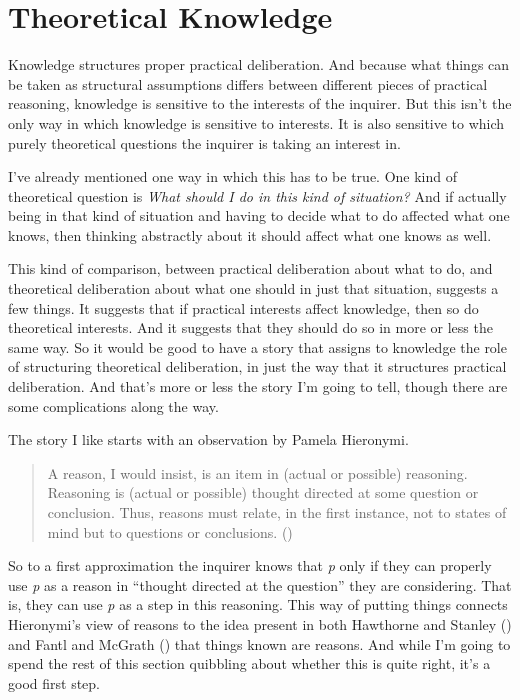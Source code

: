 \documentclass[
  12pt,
  letterpaper,
]{scrbook}
\begin{document}
\section{Theoretical Knowledge}\label{sec-theoreticalknowledge}

Knowledge structures proper practical deliberation. And because what
things can be taken as structural assumptions differs between different
pieces of practical reasoning, knowledge is sensitive to the interests
of the inquirer. But this isn't the only way in which knowledge is
sensitive to interests. It is also sensitive to which purely theoretical
questions the inquirer is taking an interest in.

I've already mentioned one way in which this has to be true. One kind of
theoretical question is \emph{What should I do in this kind of
situation?} And if actually being in that kind of situation and having
to decide what to do affected what one knows, then thinking abstractly
about it should affect what one knows as well.

This kind of comparison, between practical deliberation about what to
do, and theoretical deliberation about what one should in just that
situation, suggests a few things. It suggests that if practical
interests affect knowledge, then so do theoretical interests. And it
suggests that they should do so in more or less the same way. So it
would be good to have a story that assigns to knowledge the role of
structuring theoretical deliberation, in just the way that it structures
practical deliberation. And that's more or less the story I'm going to
tell, though there are some complications along the way.

The story I like starts with an observation by Pamela Hieronymi.

\begin{quote}
A reason, I would insist, is an item in (actual or possible) reasoning.
Reasoning is (actual or possible) thought directed at some question or
conclusion. Thus, reasons must relate, in the first instance, not to
states of mind but to questions or conclusions.
()
\end{quote}

So to a first approximation the inquirer knows that \emph{p} only if
they can properly use \emph{p} as a reason in ``thought directed at the
question'' they are considering. That is, they can use \emph{p} as a
step in this reasoning. This way of putting things connects Hieronymi's
view of reasons to the idea present in both Hawthorne and Stanley
() and Fantl and McGrath
() that things known are reasons.
And while I'm going to spend the rest of this section quibbling about
whether this is quite right, it's a good first step.
\end{document}
